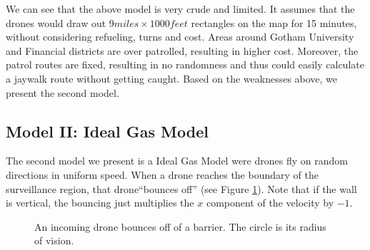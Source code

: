 \documentclass{article}
\begin{document}
We can see that the above model is very crude and limited. It assumes that the drones would draw out $9 miles \times 1000 feet $ rectangles on the map for 15 minutes, without considering refueling, turns and cost. Areas around Gotham University and Financial districts are over patrolled, resulting in higher cost. Moreover, the patrol routes are fixed, resulting in no randomness and thus could easily calculate a jaywalk route without getting caught. Based on the weaknesses above, we present the second model.


\subsection {Model II: Ideal Gas Model}
The second model we present is a Ideal Gas Model were drones fly on random directions in uniform speed. When a drone reaches the boundary of the surveillance region, that drone``bounces off'' (see Figure \ref{fig:drone-barrier-bounce}).
Note that if the wall is vertical, the bouncing just multiplies the $x$ component of the velocity by $-1$.

\begin{figure}[h]
\begin{center}
\end{center}
\caption{An incoming drone bounces off of a barrier.  The circle is its radius
	of vision.}
\label{fig:drone-barrier-bounce}
\end{figure}
\end{document}
